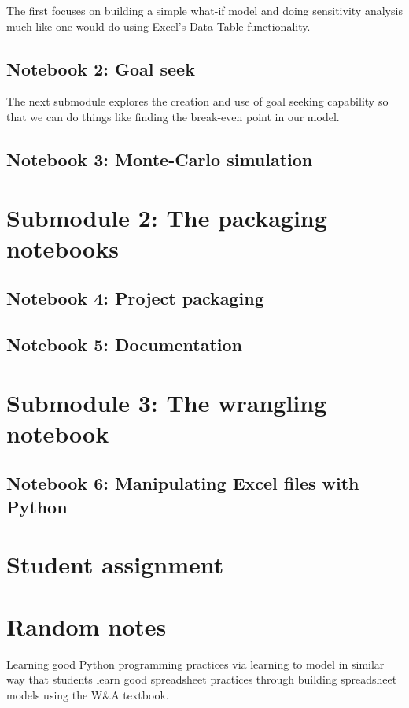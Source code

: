 \documentclass[ited,blindrev]{informs3}              %
\begin{document}
The first focuses on building a simple what-if model and doing sensitivity analysis much like one would do using Excel's Data-Table functionality.

\subsection{Notebook 2: Goal seek}

The next submodule explores the creation and use of goal seeking capability so that we can do things like finding the break-even point in our model.
 
\subsection{Notebook 3: Monte-Carlo simulation}

\section{Submodule 2: The packaging notebooks}
\subsection{Notebook 4: Project packaging}
\subsection{Notebook 5: Documentation}

\section{Submodule 3: The wrangling notebook}
\subsection{Notebook 6: Manipulating Excel files with Python}

\section{Student assignment}

\section{Random notes}
Learning good Python programming practices via learning to model in similar way that students learn good spreadsheet practices through building spreadsheet models using the W\&A textbook.
\end{document}
